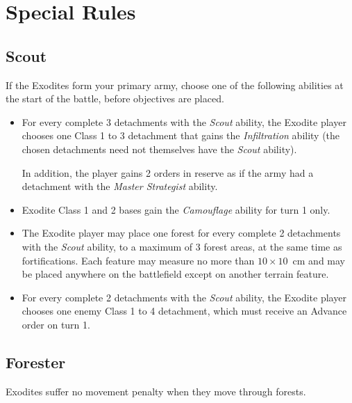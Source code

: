 \section{Special Rules}

\subsection{Scout}

If the Exodites form your primary army, choose one of the following abilities at the start of the battle, before objectives are placed.

\begin{itemize}
    \item For every complete 3 detachments with the \textit{Scout} ability, the Exodite player chooses one Class 1 to 3 detachment that gains the \textit{Infiltration} ability (the chosen detachments need not themselves have the \textit{Scout} ability).

    In addition, the player gains 2 orders in reserve as if the army had a detachment with the \textit{Master Strategist} ability.

    \item Exodite Class 1 and 2 bases gain the \textit{Camouflage} ability for turn 1 only.

    \item The Exodite player may place one forest for every complete 2 detachments with the \textit{Scout} ability, to a maximum of 3 forest areas, at the same time as fortifications. Each feature may measure no more than $10 \times 10$~cm and may be placed anywhere on the battlefield except on another terrain feature.

    \item For every complete 2 detachments with the \textit{Scout} ability, the Exodite player chooses one enemy Class 1 to 4 detachment, which must receive an Advance order on turn 1.
\end{itemize}

\subsection{Forester}

Exodites suffer no movement penalty when they move through forests.

